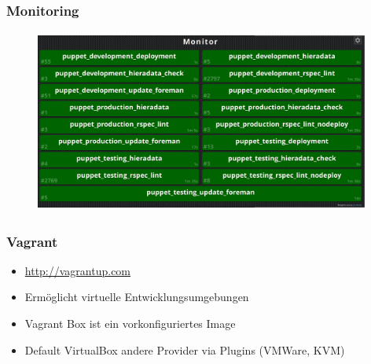 \documentclass{beamer}
\begin{document}
\begin{frame}
  \frametitle{Monitoring}
  \begin{figure}[ht]
    \centering
      \includegraphics[height=6cm,width=11cm]{../pics/jenkins_monitor.png}
    \label{fig:stack}
  \end{figure}
\end{frame}

\begin{frame}
\end{frame}


\begin{frame}
  \frametitle{Vagrant}

  \begin{itemize}
  \item \url{http://vagrantup.com}
  \item Ermöglicht virtuelle Entwicklungsumgebungen
  \item Vagrant Box ist ein vorkonfiguriertes Image
  \item Default VirtualBox andere Provider via Plugins (VMWare, KVM)
  \end{itemize}
\end{frame}

\begin{frame}
\end{frame}

\begin{frame}
\end{frame}
\end{document}
